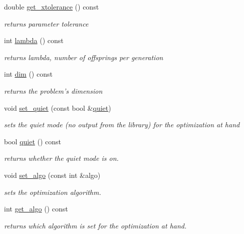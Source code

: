 \begin{DoxyCompactItemize}
double \hyperlink{classlibcmaes_1_1Parameters_a75b95a875008a0216038d43369cd9171}{get\+\_\+xtolerance} () const 
\begin{DoxyCompactList}\small\item\em returns parameter tolerance \end{DoxyCompactList}\item 
int \hyperlink{classlibcmaes_1_1Parameters_a3d569987e9a5eb61bc781ee75b2ab18a}{lambda} () const 
\begin{DoxyCompactList}\small\item\em returns lambda, number of offsprings per generation \end{DoxyCompactList}\item 
int \hyperlink{classlibcmaes_1_1Parameters_a95a3c04400a77d134bb1e9705189a24e}{dim} () const 
\begin{DoxyCompactList}\small\item\em returns the problem's dimension \end{DoxyCompactList}\item 
void \hyperlink{classlibcmaes_1_1Parameters_ae93cf5c15dbe42b19339b26b1c57f872}{set\+\_\+quiet} (const bool \&\hyperlink{classlibcmaes_1_1Parameters_a8562a739088f9f9f466b8d658084c9f7}{quiet})
\begin{DoxyCompactList}\small\item\em sets the quiet mode (no output from the library) for the optimization at hand \end{DoxyCompactList}\item 
bool \hyperlink{classlibcmaes_1_1Parameters_a8562a739088f9f9f466b8d658084c9f7}{quiet} () const 
\begin{DoxyCompactList}\small\item\em returns whether the quiet mode is on. \end{DoxyCompactList}\item 
void \hyperlink{classlibcmaes_1_1Parameters_aeb869d18fa0c987f56216d9bfa1f1a0d}{set\+\_\+algo} (const int \&algo)
\begin{DoxyCompactList}\small\item\em sets the optimization algorithm. \end{DoxyCompactList}\item 
int \hyperlink{classlibcmaes_1_1Parameters_a39697cd6cfb705a970223f8e95894545}{get\+\_\+algo} () const 
\begin{DoxyCompactList}\small\item\em returns which algorithm is set for the optimization at hand. \end{DoxyCompactList}\item 

\end{DoxyCompactItemize}
